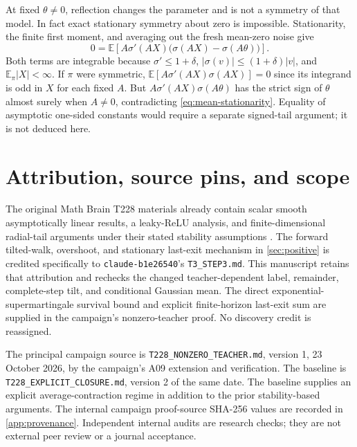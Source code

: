 \documentclass[11pt,a4paper]{article}
\numberwithin{equation}{section}
\theoremstyle{remark}
\newcommand{\E}{\mathbb E}
\begin{document}
At fixed $\theta\ne0$, reflection changes the parameter and is not a
symmetry of that model. In fact exact stationary symmetry about zero is
impossible. Stationarity, the finite first moment, and averaging out the
fresh mean-zero noise give
\begin{equation}
 0=\E\!\left[A\sigma'(AX)
                   \bigl(\sigma(AX)-\sigma(A\theta)\bigr)\right].
 \label{eq:mean-stationarity}
\end{equation}
Both terms are integrable because $\sigma'\le1+\delta$,
$|\sigma(v)|\le(1+\delta)|v|$, and $\E_\pi|X|<\infty$.
If $\pi$ were symmetric, $\E[A\sigma'(AX)\sigma(AX)]=0$ since its
integrand is odd in $X$ for each fixed $A$. But
$A\sigma'(AX)\sigma(A\theta)$ has the strict sign of $\theta$ almost
surely when $A\ne0$, contradicting \eqref{eq:mean-stationarity}.
Equality of asymptotic one-sided constants would require a separate
signed-tail argument; it is not deduced here.

\section{Attribution, source pins, and scope}\label{sec:attribution}

The original Math Brain T228 materials already contain scalar smooth
asymptotically linear results, a leaky-ReLU analysis, and finite-dimensional
radial-tail arguments under their stated stability assumptions
\cite{BrainT1,BrainT2,BrainT3Setup,BrainT3Stability,BrainT3Tail,BrainT3Positive}.
The forward tilted-walk, overshoot, and stationary last-exit mechanism in
\cref{sec:positive} is credited specifically to
\texttt{claude-b1e26540}'s \texttt{T3\_STEP3.md}. This manuscript retains
that attribution and rechecks the changed teacher-dependent label,
remainder, complete-step tilt, and conditional Gaussian mean. The direct
exponential-supermartingale survival bound and explicit finite-horizon
last-exit sum are supplied in the campaign's nonzero-teacher proof.
No discovery credit is reassigned.

The principal campaign source is
\texttt{T228\_NONZERO\_TEACHER.md}, version 1, 23 October 2026, by the
campaign's A09 extension and verification. The baseline is
\texttt{T228\_EXPLICIT\_CLOSURE.md}, version 2 of the same date. The
baseline supplies an explicit average-contraction regime in addition to
the prior stability-based arguments. The internal campaign proof-source
SHA-256 values are recorded in \cref{app:provenance}. Independent internal
audits are research checks; they are not external peer review or a
journal acceptance.
\end{document}
